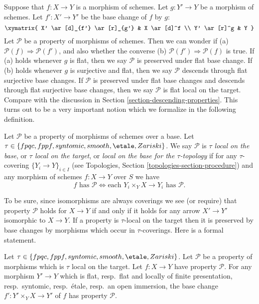 \noindent
Suppose that $f : X \to Y$ is a morphism of schemes.
Let $g : Y' \to Y$ be a morphism of schemes.
Let $f' : X' \to Y'$ be the base change of $f$ by $g$:
$$
\xymatrix{
X' \ar[d]_{f'} \ar[r]_{g'} & X \ar[d]^f \\
Y' \ar[r]^g & Y
}
$$
Let $\mathcal{P}$ be a property of morphisms of schemes.
Then we can wonder if (a) $\mathcal{P}(f) \Rightarrow \mathcal{P}(f')$,
and also whether the converse (b) $\mathcal{P}(f') \Rightarrow \mathcal{P}(f)$
is true. If (a) holds whenever $g$ is flat, then we say $\mathcal{P}$
is preserved under flat base change. If (b) holds whenever $g$ is
surjective and flat, then we say $\mathcal{P}$ descends through
flat surjective base changes. If $\mathcal{P}$ is preserved under
flat base changes and descends through flat surjective base changes,
then we say $\mathcal{P}$ is flat local on the target.
Compare with the discussion in
Section \ref{section-descending-properties}.
This turns out to be a very important notion which
we formalize in the following definition.

\begin{definition}
\label{definition-property-morphisms-local}
Let $\mathcal{P}$ be a property of morphisms of schemes over a base.
Let $\tau \in \{fpqc, fppf, syntomic, smooth, \etale, Zariski\}$.
We say $\mathcal{P}$ is {\it $\tau$ local on the base}, or
{\it $\tau$ local on the target}, or
{\it local on the base for the $\tau$-topology} if for any
$\tau$-covering $\{Y_i \to Y\}_{i \in I}$ (see
Topologies, Section \ref{topologies-section-procedure})
and any morphism of schemes $f : X \to Y$ over $S$ we
have
$$
f \text{ has }\mathcal{P}
\Leftrightarrow
\text{each }Y_i \times_Y X \to Y_i\text{ has }\mathcal{P}.
$$
\end{definition}

\noindent
To be sure, since isomorphisms are always coverings
we see (or require) that property $\mathcal{P}$ holds for $X \to Y$
if and only if it holds for any arrow $X' \to Y'$ isomorphic to $X \to Y$.
If a property is $\tau$-local on the target then it is preserved
by base changes by morphisms which occur in $\tau$-coverings. Here
is a formal statement.

\begin{lemma}
\label{lemma-pullback-property-local-target}
Let $\tau \in \{fpqc, fppf, syntomic, smooth, \etale, Zariski\}$.
Let $\mathcal{P}$ be a property of morphisms which is $\tau$ local
on the target. Let $f : X \to Y$ have property $\mathcal{P}$.
For any morphism $Y' \to Y$ which is
flat, resp.\ flat and locally of finite presentation, resp.\ syntomic,
resp.\ \'etale, resp.\ an open immersion, the base change
$f' : Y' \times_Y X \to Y'$ of $f$ has property $\mathcal{P}$.
\end{lemma}

